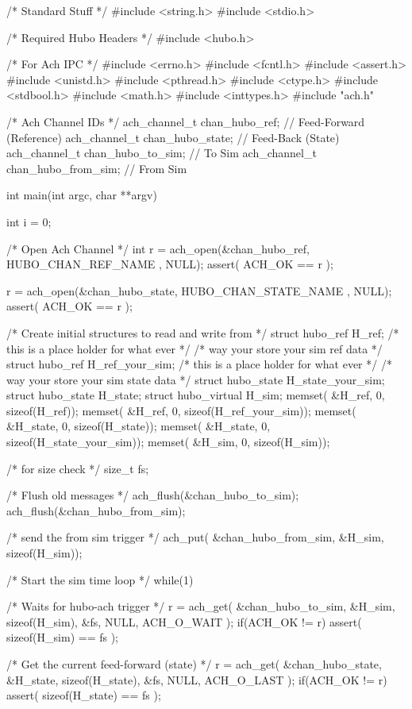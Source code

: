 \begin{code}
/* Standard Stuff */
#include <string.h>
#include <stdio.h>

/* Required Hubo Headers */
#include <hubo.h>

/* For Ach IPC */
#include <errno.h>
#include <fcntl.h>
#include <assert.h>
#include <unistd.h>
#include <pthread.h>
#include <ctype.h>
#include <stdbool.h>
#include <math.h>
#include <inttypes.h>
#include "ach.h"

/* Ach Channel IDs */
ach_channel_t chan_hubo_ref;      // Feed-Forward (Reference)
ach_channel_t chan_hubo_state;    // Feed-Back (State)
ach_channel_t chan_hubo_to_sim;    // To Sim
ach_channel_t chan_hubo_from_sim;    // From Sim

int main(int argc, char **argv) {
    
    int i = 0;

    /* Open Ach Channel */
    int r = ach_open(&chan_hubo_ref, HUBO_CHAN_REF_NAME , NULL);
    assert( ACH_OK == r );

    r = ach_open(&chan_hubo_state, HUBO_CHAN_STATE_NAME , NULL);
    assert( ACH_OK == r );

    /* Create initial structures to read and write from */
    struct hubo_ref H_ref;
    /* this is a place holder for what ever */
    /* way your store your sim ref data     */
    struct hubo_ref H_ref_your_sim;  
    /* this is a place holder for what ever */
    /* way your store your sim state data   */
    struct hubo_state H_state_your_sim; 
    struct hubo_state H_state;
    struct hubo_virtual H_sim;
    memset( &H_ref,   0, sizeof(H_ref));
    memset( &H_ref,   0, sizeof(H_ref_your_sim));
    memset( &H_state, 0, sizeof(H_state));
    memset( &H_state, 0, sizeof(H_state_your_sim));
    memset( &H_sim, 0, sizeof(H_sim));

    /* for size check */
    size_t fs;

    /* Flush old messages */
    ach_flush(&chan_hubo_to_sim);
    ach_flush(&chan_hubo_from_sim);

    /* send the from sim trigger */
    ach_put( &chan_hubo_from_sim, &H_sim, sizeof(H_sim));

    /* Start the sim time loop */
    while(1) {
        /* Waits for hubo-ach trigger */
        r = ach_get( &chan_hubo_to_sim, &H_sim, sizeof(H_sim), &fs, NULL, ACH_O_WAIT );
        if(ACH_OK != r) {
            assert( sizeof(H_sim) == fs );
        }

        /* Get the current feed-forward (state) */
        r = ach_get( &chan_hubo_state, &H_state, sizeof(H_state), &fs, NULL, ACH_O_LAST );
        if(ACH_OK != r) {
            assert( sizeof(H_state) == fs );
        }
        
}}
\end{code}
